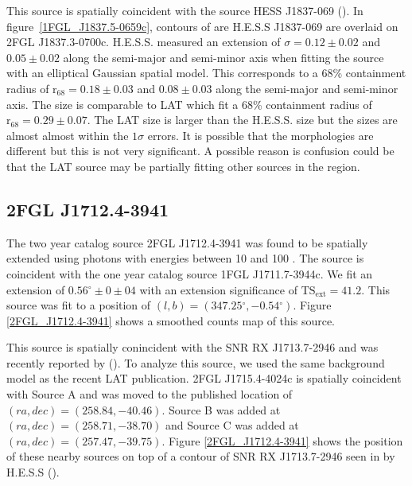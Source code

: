 \documentclass[12pt,preprint]{aastex}
\newcommand{\gev}{\text{GeV}\xspace}
\newcommand{\tev}{\text{TeV}\xspace}
\newcommand{\tsext}{{\ensuremath{\text{TS}_\text{ext}}}\xspace}
\newcommand{\rsixeight}{{\ensuremath{\text{r}_{68}}}\xspace}
\renewcommand{\deg}{\ensuremath{^\circ}\xspace}
\begin{document}
This source is spatially coincident with the \tev source HESS J1837-069
(\cite{hess_plane_survey}).  In figure~\ref{1FGL_J1837.5-0659c},
contours of are H.E.S.S J1837-069 are overlaid on 2FGL
J1837.3-0700c. H.E.S.S. measured an extension of $\sigma=0.12\pm0.02$
and $0.05\pm0.02$ along the semi-major and semi-minor axis when fitting
the source with an elliptical Gaussian spatial model.  This corresponds to
a 68\% containment radius of $\rsixeight=0.18\pm0.03$ and $0.08\pm0.03$
along the semi-major and semi-minor axis. The size is comparable to
LAT which fit a 68\% containment radius of $\rsixeight=0.29\pm0.07$.
The LAT size is larger than the H.E.S.S. size but the sizes are almost
almost within the $1\sigma$ errors. It is possible that the morphologies
are different but this is not very significant.  A possible reason is
confusion could be that the LAT source may be partially fitting other
sources in the region.



\subsection{2FGL J1712.4-3941}
\label{section_2FGL_J1712.4-3941}


The two year catalog source 2FGL J1712.4-3941 was found to be
spatially extended using photons with energies between 10 \gev and
100 \gev. The source is coincident with the one year catalog source
1FGL J1711.7-3944c. We fit an extension of $0.56\deg\pm0\pm04$ with an
extension significance of $\tsext=41.2$. This source was fit to a position
of $(l,b)=(347.25\deg,-0.54\deg)$. Figure \ref{2FGL_J1712.4-3941} shows
a smoothed counts map of this source.

This source is spatially conincident with the SNR RX J1713.7-2946 and was
recently reported by (\cite{rx_j1713_lat}).  To analyze this source,
we used the same background model as the recent LAT publication.
2FGL J1715.4-4024c is spatially coincident with Source A and was
moved to the published location of $(ra,dec)=(258.84,-40.46)$. Source
B was added at $(ra,dec)=(258.71,-38.70)$ and Source C was added at
$(ra,dec)=(257.47,-39.75)$.  Figure \ref{2FGL_J1712.4-3941} shows
the position of these nearby sources on top of a contour of SNR RX
J1713.7-2946 seen in \tev by H.E.S.S (\cite{rx_j1713_hess}).
\end{document}
